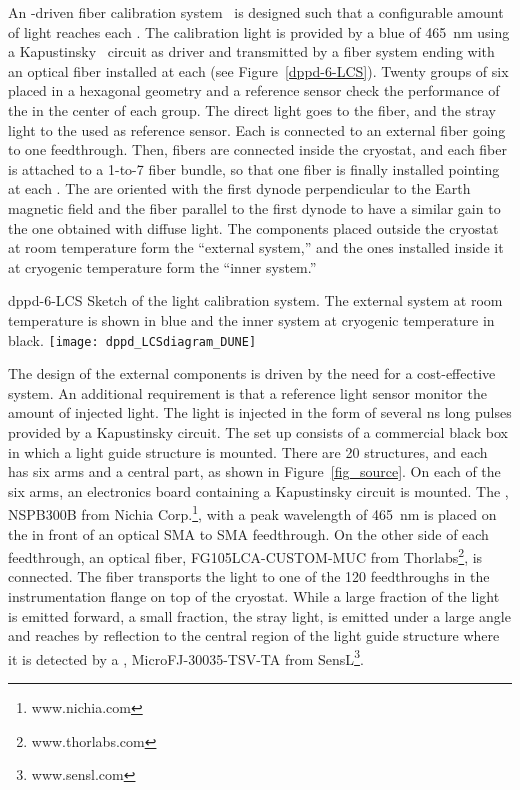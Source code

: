 An -driven fiber calibration system~\cite{Cuesta:2017nrs,Conrad:2015xta,Caccianiga:2003fm,ADAMSON2002325,Belver:2019lqm} is designed such that a configurable amount of light reaches each . The calibration light is provided by a blue  of \SI{465}{\nm} using a Kapustinsky~\cite{KAPUSTINSKY1985612} circuit as  driver and transmitted by a fiber system ending with an optical fiber installed at each  (see Figure~\ref{dppd-6-LCS}). Twenty groups of six  placed in a hexagonal geometry and a reference sensor check the performance of the  in the center of each group. The direct light goes to the fiber, and the stray light to the  used as reference sensor. Each  is connected to an external fiber going to one feedthrough. Then, fibers are connected inside the cryostat, and each fiber is attached to a 1-to-7 fiber bundle, so that one fiber is finally installed pointing at each . The  are oriented with the first dynode perpendicular to the Earth magnetic field and the fiber parallel to the first dynode to have a similar gain to the one obtained with diffuse light. The components placed outside the cryostat at room temperature form the ``external system,'' and the ones installed inside it at cryogenic temperature form the ``inner system.'' 

\begin{dunefigure}{dppd-6-LCS}
{Sketch of the    light calibration system. The external system at room temperature is shown in blue and the inner system at cryogenic temperature in black.}
\texttt{[image: dppd\_LCSdiagram\_DUNE]}
\end{dunefigure}


The design of the external components is driven by the need for a cost-effective system. An additional requirement is that a reference light sensor monitor the amount of injected light. The light is injected in the form of several \si{\ns} long pulses provided by a Kapustinsky circuit. The set up consists of a commercial black box in which a light guide structure is mounted. There are \num{20} structures, and each has six arms and a central part, as shown in Figure~\ref{fig_source}. On each of the six arms, an electronics board containing a Kapustinsky circuit is mounted. The , NSPB300B from Nichia Corp.\footnote{www.nichia.com}, with a peak wavelength of \SI{465}{nm} is placed  on the  in front of an optical SMA to SMA  feedthrough. On the other side of each feedthrough, an optical fiber, FG105LCA-CUSTOM-MUC from Thorlabs\footnote{www.thorlabs.com}, is connected. The fiber transports the light to one of the \num{120} feedthroughs in the instrumentation flange on top of the cryostat. While a large fraction of the  light is emitted forward, a small fraction, the stray light, is emitted under a large angle and reaches by reflection to the central region of the light guide structure where it is detected by a , MicroFJ-30035-TSV-TA from SensL\footnote{www.sensl.com}.


